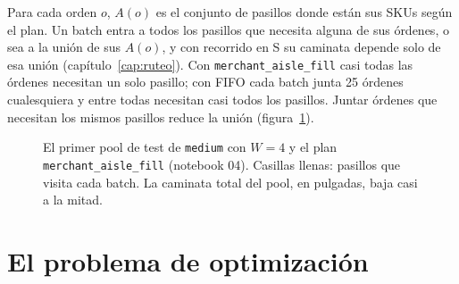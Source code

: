 \documentclass[11pt,a4paper,oneside]{report}
\newcommand{\code}[1]{\texttt{\small #1}}
\begin{document}
Para cada orden $o$, $A(o)$ es el conjunto de pasillos donde están sus SKUs según el plan. Un
batch entra a todos los pasillos que necesita alguna de sus órdenes, o sea a la unión de sus
$A(o)$, y con recorrido en S su caminata depende solo de esa unión
(capítulo~\ref{cap:ruteo}). Con \code{merchant\_aisle\_fill} casi todas las órdenes necesitan
un solo pasillo; con FIFO cada batch junta 25 órdenes cualesquiera y entre todas necesitan
casi todos los pasillos. Juntar órdenes que necesitan los mismos pasillos reduce la unión
(figura~\ref{fig:pool_ejemplo}).

\begin{figure}[ht]
\centering
{}
\caption{El primer pool de test de \code{medium} con $W = 4$ y el plan
\code{merchant\_aisle\_fill} (notebook 04). Casillas llenas: pasillos que visita cada batch. La
caminata total del pool, en pulgadas, baja casi a la mitad.}
\label{fig:pool_ejemplo}
\end{figure}

\section{El problema de optimización}
\end{document}

